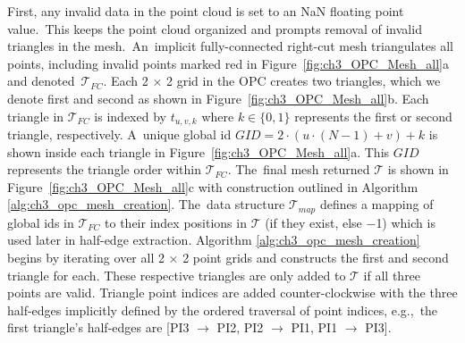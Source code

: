 First, any invalid data in the point cloud is set to an NaN floating point value.~This keeps the point cloud organized and prompts removal of invalid triangles in the mesh.~An~implicit fully-connected right-cut mesh triangulates all points, including invalid points marked red in Figure~\ref{fig:ch3_OPC_Mesh_all}a and denoted~$\mathcal{T}_{FC}$.  Each 2 $\times$ 2 grid in the OPC creates two triangles, which we denote first and second as shown in Figure~\ref{fig:ch3_OPC_Mesh_all}b. Each triangle in $\mathcal{T}_{FC}$ is indexed by $t_{u,v,k}$ where  $k \in \{0,1\}$ represents the first or second triangle, respectively. A~unique global id $GID = 2 \cdot (u \cdot (N-1) + v) + k$ is shown inside each triangle in Figure~\ref{fig:ch3_OPC_Mesh_all}a. This $GID$ represents the triangle order within $\mathcal{T}_{FC}$.  The~final mesh returned $\mathcal{T}$ is shown in Figure~\ref{fig:ch3_OPC_Mesh_all}c with construction outlined in Algorithm \ref{alg:ch3_opc_mesh_creation}. The~data structure $\mathcal{T}_{map}$ defines a mapping of global ids in $\mathcal{T}_{FC}$ to their index positions in $\mathcal{T}$ (if they exist, else  $-$1) which is used later in half-edge extraction. Algorithm \ref{alg:ch3_opc_mesh_creation} begins by iterating over all 2 $\times$ 2 point grids and constructs the first and second triangle for each. These respective triangles are only added to $\mathcal{T}$ if all three points are valid. Triangle point indices are added counter-clockwise with the three half-edges implicitly defined by the ordered traversal of point indices, e.g.,~the first triangle's half-edges are [PI3 $\rightarrow$ PI2, PI2 $\rightarrow$ PI1, PI1 $\rightarrow$ PI3]. 







